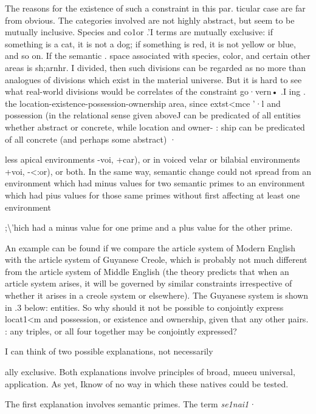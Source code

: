The reasons for the existence of such a constraint in this par. ticular case are far from obvious. The categories involved are not
highly abstract, but seem to be mutually inclusive. Species and co1or .'I terms are mutually exclusive: if something is a cat, it is not a dog; if something is red, it is not yellow or blue, and so on. If the semantic . space associated with species, color, and certain other areas is sh;arnhr. I divided, then such divisions can be regarded as no more than analogues
of divisions which exist in the material universe. But it is hard to see what real{}-world divisions would be correlates of the constraint go·vern• .I ing . the location-existence-possession-ownership area, since extst{\textless}mce '·l and possession (in the relational sense given aboveJ can be predicated
of all entities whether abstract or concrete, while location and owner- : ship can be predicated of all concrete (and perhaps some abstract) ·


less apical environments {}-voi, +car), or in voiced velar or bilabial environments +voi, {}-{\textless}:or), or both. In the same way, semantic change could not spread from an environment which had minus values for two semantic primes to an environment which had pius values for those same primes without first affecting at least one environment

;{\textbackslash}'hich had a minus value for one prime and a plus value for the other
prime.

An example can be found if we compare the article system of Modern English with the article system of Guyanese Creole, which is probably not much different from the article system of Middle English (the theory predicts that when an article system arises, it will be governed by similar constraints irrespective of whether it arises in a creole system or elsewhere). The Guyanese system is shown in .3 below:
entities. So why should it not be possible to conjointly express locat1{\textless}m and possession, or existence and ownership, given that any other µairs. : any triples, or all four together may be conjointly expressed?

I can think of two possible explanations, not necessarily

ally exclusive. Both explanations involve principles of broad, mueeu universal, application. As yet, Iknow of no way in which these natives could be tested.

The first explanation involves semantic primes. The term \textit{se1nai1·}


